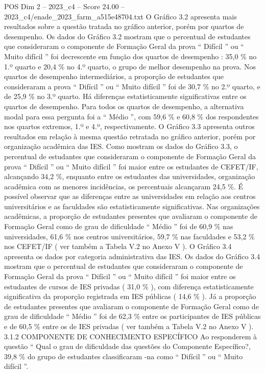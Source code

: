 \begin{textsample}{POS Dim 2 – 2023\_c4 – Score 24.00 – 2023\_c4/enade\_2023\_farm\_a515e48704.txt}
O Gráfico 3.2 apresenta mais resultados sobre a questão tratada no gráfico anterior, porém por quartos de desempenho.
Os dados do Gráfico 3.2 mostram que o percentual de estudantes que consideraram o componente de Formação Geral da prova “ Difícil ” ou “ Muito difícil ” foi decrescente em função dos quartos de desempenho : 35,0 \% no 1.º quarto e 20,4 \% no 4.º quarto, o grupo de melhor desempenho na prova.
Nos quartos de desempenho intermediários, a proporção de estudantes que consideraram a prova “ Difícil ” ou “ Muito difícil ” foi de 30,7 \% no 2.º quarto, e de 25,9 \% no 3.º quarto.
Há diferenças estatisticamente significativas entre os quartos de desempenho.
Para todos os quartos de desempenho, a alternativa modal para essa pergunta foi a “ Médio ”, com 59,6 \% e 60,8 \% dos respondentes nos quartos extremos, 1.º e 4.º, respectivamente.
O Gráfico 3.3 apresenta outros resultados em relação à mesma questão retratada no gráfico anterior, porém por organização acadêmica das IES.
Como mostram os dados do Gráfico 3.3, o percentual de estudantes que consideraram o componente de Formação Geral da prova “ Difícil ” ou “ Muito difícil ” foi maior entre os estudantes de CEFET/IF, alcançando 34,2 \%, enquanto entre os estudantes das universidades, organização acadêmica com as menores incidências, os percentuais alcançaram 24,5 \%.
É possível observar que as diferenças entre as universidades em relação aos centros universitários e as faculdades são estatisticamente significativas.
Nas organizações acadêmicas, a proporção de estudantes presentes que avaliaram o componente de Formação Geral como de grau de dificuldade “ Médio ” foi de 60,9 \% nas universidades, 61,6 \% nos centros universitários, 59,7 \% nas faculdades e 53,2 \% nos CEFET/IF ( ver também a Tabela V.2 no Anexo V ).
O Gráfico 3.4 apresenta os dados por categoria administrativa das IES.
Os dados do Gráfico 3.4 mostram que o percentual de estudantes que consideraram o componente de Formação Geral da prova “ Difícil ” ou “ Muito difícil ” foi maior entre os estudantes de cursos de IES privadas ( 31,0 \% ), com diferença estatisticamente significativa da proporção registrada em IES públicas ( 14,6 \% ).
Já a proporção de estudantes presentes que avaliaram o componente de Formação Geral como de grau de dificuldade “ Médio ” foi de 62,3 \% entre os participantes de IES públicas e de 60,5 \% entre os de IES privadas ( ver também a Tabela V.2 no Anexo V ). 3.1.2 COMPONENTE DE CONHECIMENTO ESPECÍFICO Ao responderem à questão “ Qual o grau de dificuldade das questões do Componente Específico?, 39,8 \% do grupo de estudantes classificaram -na como “ Difícil ” ou “ Muito difícil ”.

\end{textsample}
